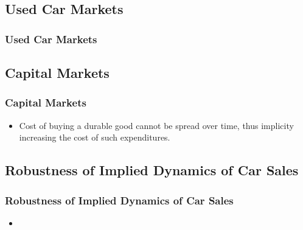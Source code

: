 \documentclass{beamer}
\begin{document}
\subsection{Used Car Markets}
\begin{frame}
\frametitle{Used Car Markets}
\end{frame}

\subsection{Capital Markets}
\begin{frame}
\frametitle{Capital Markets}
\begin{itemize}
\item Cost of buying a durable good cannot be spread over time, thus implicity increasing the cost of such expenditures.
\end{itemize}
\end{frame}

\subsection{Robustness of Implied Dynamics of Car Sales}
\begin{frame}
\frametitle{Robustness of Implied Dynamics of Car Sales}
\begin{itemize}
\item
\end{itemize}
\end{frame}
\end{document}

